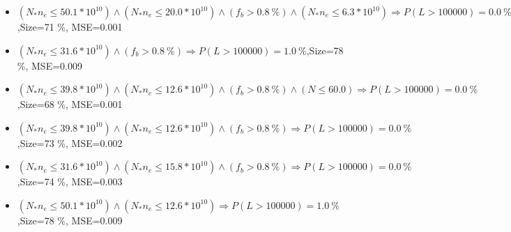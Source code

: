 \documentclass[numbered]{CSL}
\begin{document}
\begin{itemize}
\item $(N_* n_e \leq 50.1 * 10^{10}) \land (N_* n_e \leq 20.0 * 10^{10}) \land (f_b > 0.8~\%) \land (N_* n_e \leq 6.3 * 10^{10}) \Rightarrow P(L > 100 000) = 0.0~\%$,\hfill Size=71 \%, MSE=0.001
\item $(N_* n_e \leq 31.6 * 10^{10}) \land (f_b > 0.8~\%) \Rightarrow P(L > 100 000) = 1.0~\%$,\hfill Size=78 \%, MSE=0.009
\item $(N_* n_e \leq 39.8 * 10^{10}) \land (N_* n_e \leq 12.6 * 10^{10}) \land (f_b > 0.8~\%) \land (N \leq 60.0) \Rightarrow P(L > 100 000) = 0.0~\%$,\hfill Size=68 \%, MSE=0.001
\item $(N_* n_e \leq 39.8 * 10^{10}) \land (N_* n_e \leq 12.6 * 10^{10}) \land (f_b > 0.8~\%) \Rightarrow P(L > 100 000) = 0.0~\%$,\hfill Size=73 \%, MSE=0.002
\item $(N_* n_e \leq 31.6 * 10^{10}) \land (N_* n_e \leq 15.8 * 10^{10}) \land (f_b > 0.8~\%) \Rightarrow P(L > 100 000) = 0.0~\%$,\hfill Size=74 \%, MSE=0.003
\item $(N_* n_e \leq 50.1 * 10^{10}) \land (N_* n_e \leq 12.6 * 10^{10}) \Rightarrow P(L > 100 000) = 1.0~\%$,\hfill Size=78 \%, MSE=0.009
\end{itemize}
\end{document}
